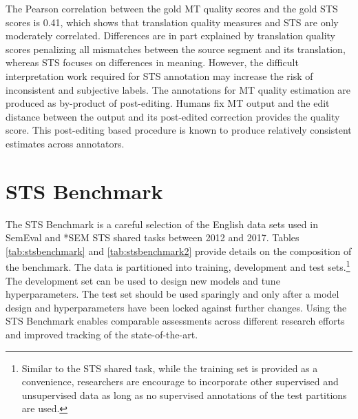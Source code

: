 \documentclass[11pt,a4paper]{article}
\begin{document}
The Pearson correlation between the gold MT quality scores and the gold STS scores is 0.41, which shows that translation quality measures and STS are only moderately correlated. Differences are in part explained by translation quality scores penalizing all mismatches between the source segment and its translation, whereas STS focuses on differences in meaning. However, the difficult interpretation work required for STS annotation may increase the risk of inconsistent and subjective labels. The annotations for MT quality estimation are produced as by-product of post-editing. Humans fix MT output and the edit distance between the output and its post-edited correction provides the quality score. This post-editing based procedure is known to produce relatively consistent estimates across annotators.

\section{STS Benchmark}
\label{sec:STSbenchmark}

The STS Benchmark is a careful selection of the English data sets used in SemEval and *SEM STS shared tasks between 2012 and 2017. Tables \ref{tab:stsbenchmark}  and \ref{tab:stsbenchmark2} provide details on the composition of the benchmark. 
The data is partitioned into  training, development and test sets.\footnote{Similar to the STS shared task, while the training set is provided as a convenience, researchers are encourage to incorporate other supervised and unsupervised data as long as no supervised annotations of the test partitions are used.} The development set can 
be used to design new models and tune hyperparameters. The test set should be used sparingly and only after a model design and hyperparameters have been locked against further changes. Using the STS Benchmark enables comparable assessments across different research efforts and improved tracking of the state-of-the-art.
\end{document}
